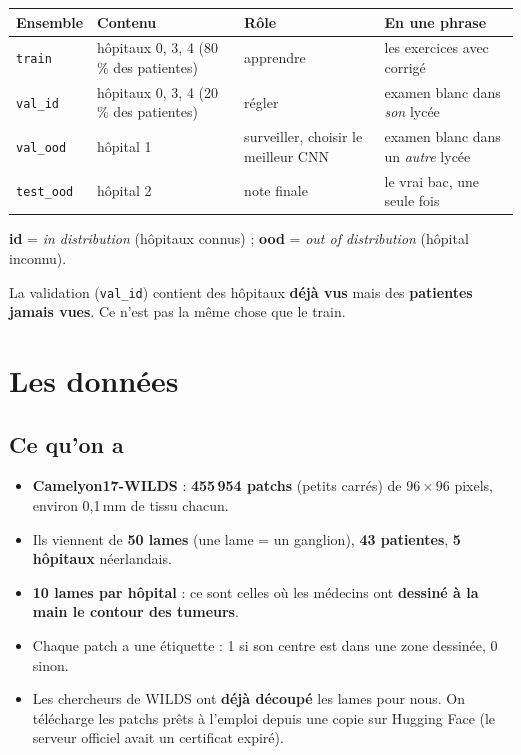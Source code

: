 \documentclass[11pt,a4paper]{article}
\begin{document}
\begin{table}[H]
\centering\small
\begin{tabularx}{\textwidth}{lllX}
\toprule
\textbf{Ensemble} & \textbf{Contenu} & \textbf{Rôle} & \textbf{En une phrase} \\
\midrule
\texttt{train} & hôpitaux 0, 3, 4 (80\,\% des patientes) & apprendre & les exercices avec corrigé \\
\texttt{val\_id} & hôpitaux 0, 3, 4 (20\,\% des patientes) & régler & examen blanc dans \emph{son} lycée \\
\texttt{val\_ood} & hôpital 1 & surveiller, choisir le meilleur CNN & examen blanc dans un \emph{autre} lycée \\
\texttt{test\_ood} & hôpital 2 & note finale & le vrai bac, une seule fois \\
\bottomrule
\end{tabularx}
\end{table}
\noindent \textbf{id} = \emph{in distribution} (hôpitaux connus) ; \textbf{ood} = \emph{out of distribution} (hôpital inconnu).

\begin{piege}
La validation (\texttt{val\_id}) contient des hôpitaux \textbf{déjà vus} mais des \textbf{patientes jamais vues}. Ce n'est pas la
même chose que le train.
\end{piege}

\section{Les données}\label{sec:donnees}

\subsection{Ce qu'on a}
\begin{itemize}
  \item \textbf{Camelyon17-WILDS} : \textbf{455\,954 patchs} (petits carrés) de $96\times96$ pixels, environ 0,1\,mm de tissu chacun.
  \item Ils viennent de \textbf{50 lames} (une lame = un ganglion), \textbf{43 patientes}, \textbf{5 hôpitaux} néerlandais.
  \item \textbf{10 lames par hôpital} : ce sont celles où les médecins ont \textbf{dessiné à la main le contour des tumeurs}.
  \item Chaque patch a une étiquette : 1 si son centre est dans une zone dessinée, 0 sinon.
  \item Les chercheurs de WILDS ont \textbf{déjà découpé} les lames pour nous. On télécharge les patchs prêts à l'emploi depuis une copie
        sur Hugging Face (le serveur officiel avait un certificat expiré).
\end{itemize}
\end{document}
